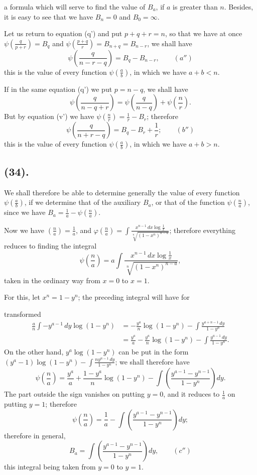 \documentclass{article}
\begin{document}
a formula which will serve to find the value of $B_{a}$, if $a$ is greater than $n$. Besides, it is easy to see that we have $B_{n}=0$ and $B_{0}=\infty$.

Let us return to equation (q') and put $p+q+r=n$, so that we have at once $\psi\left(\frac{q}{p+r}\right)=B_{q}$ and $\psi\left(\frac{p+q}{r}\right)=B_{n+q}=B_{n-r}$, we shall have
\[ \psi\left(\frac{q}{n-r-q}\right)=B_{q}-B_{n-r},\qquad(a'') \]
this is the value of every function $\psi\left(\frac{a}{b}\right)$, in which we have $a+b<n$.

If in the same equation (q') we put $p=n-q$, we shall have
\[ \psi\left(\frac{q}{n-q+r}\right)=\psi\left(\frac{q}{n-q}\right)+\psi\left(\frac{n}{r}\right). \]
But by equation (v') we have $\psi\left(\frac{n}{r}\right)=\frac{1}{r}-B_{r}$; therefore
\[ \psi\left(\frac{q}{n+r-q}\right)=B_{q}-B_{r}+\frac{1}{r};\qquad(b'') \]
this is the value of every function $\psi\left(\frac{a}{b}\right)$, in which we have $a+b>n$.

\subsection*{(34).}

We shall therefore be able to determine generally the value of every function $\psi\left(\frac{a}{b}\right)$, if we determine that of the auxiliary $B_{a}$, or that of the function $\psi\left(\frac{n}{a}\right)$, since we have $B_{a}=\frac{1}{a}-\psi\left(\frac{n}{a}\right)$.

Now we have $\left(\frac{n}{a}\right)=\frac{1}{a}$, and $\varphi\left(\frac{n}{a}\right)=\displaystyle\int\frac{x^{n-1}\,dx\log\frac{1}{x}}{\sqrt[n]{(1-x^{n})^{n-a}}}$; therefore everything reduces to finding the integral
\[ \psi\left(\frac{n}{a}\right)=a\int\frac{x^{n-1}\,dx\log\frac{1}{x}}{\sqrt[n]{(1-x^{n})^{n-a}}}, \]
taken in the ordinary way from $x=0$ to $x=1$.

For this, let $x^{n}=1-y^{n}$; the preceding integral will have for

transformed
\[ \begin{aligned} \frac{a}{n}\int-y^{a-1}\,dy\log(1-y^{n})&=-\frac{y^{a}}{n}\log(1-y^{n})-\int\frac{y^{a+n-1}\,dy}{1-y^{n}}\\ &=\frac{y^{a}}{a}-\frac{y^{a}}{n}\log(1-y^{n})-\int\frac{y^{a-1}\,dy}{1-y^{n}}. \end{aligned} \]
On the other hand, $y^{a}\log(1-y^{n})$ can be put in the form $(y^{a}-1)\log(1-y^{n})-\displaystyle\int\frac{ny^{n-1}\,dy}{1-y^{n}}$; we shall therefore have
\[ \psi\left(\frac{n}{a}\right)=\frac{y^{a}}{a}+\frac{1-y^{a}}{n}\log(1-y^{n})-\int\left(\frac{y^{a-1}-y^{n-1}}{1-y^{n}}\right)dy. \]
The part outside the sign vanishes on putting $y=0$, and it reduces to $\frac{1}{a}$ on putting $y=1$; therefore
\[ \psi\left(\frac{n}{a}\right)=\frac{1}{a}-\int\left(\frac{y^{a-1}-y^{n-1}}{1-y^{n}}\right)dy; \]
therefore in general,
\[ B_{a}=\int\left(\frac{y^{a-1}-y^{n-1}}{1-y^{n}}\right)dy,\qquad(c'') \]
this integral being taken from $y=0$ to $y=1$.
\end{document}

